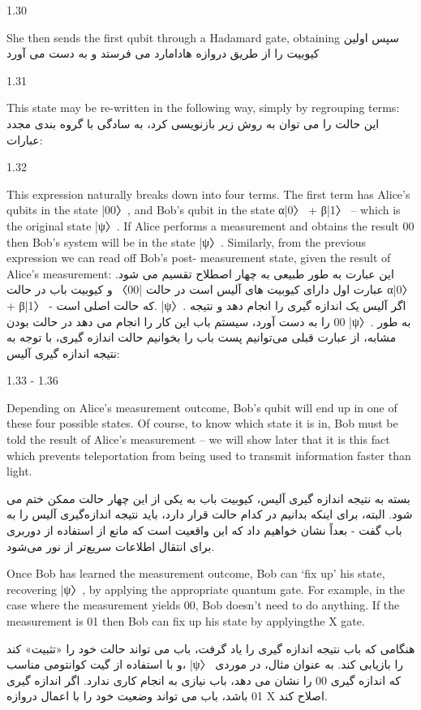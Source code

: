 \documentclass{book}
\begin{document}
1.30


She then sends the first qubit through a Hadamard gate, obtaining
سپس اولین کیوبیت را از طریق دروازه هادامارد می فرستد و به دست می آورد

1.31


This state may be re-written in the following way, simply by regrouping terms:
این حالت را می توان به روش زیر بازنویسی کرد، به سادگی با گروه بندی مجدد عبارات:

1.32


This expression naturally breaks down into four terms. The first term has Alice’s qubits
in the state |00〉, and Bob’s qubit in the state α|0〉 + β|1〉 – which is the original state
|ψ〉. If Alice performs a measurement and obtains the result 00 then Bob’s system will
be in the state |ψ〉. Similarly, from the previous expression we can read off Bob’s post-
measurement state, given the result of Alice’s measurement:
این عبارت به طور طبیعی به چهار اصطلاح تقسیم می شود. عبارت اول دارای کیوبیت های آلیس است
در حالت |00〉 و کیوبیت باب در حالت α|0〉 + β|1〉 - که حالت اصلی است.
|ψ〉. اگر آلیس یک اندازه گیری را انجام دهد و نتیجه 00 را به دست آورد، سیستم باب این کار را انجام می دهد
در حالت بودن |ψ〉. به طور مشابه، از عبارت قبلی می‌توانیم پست باب را بخوانیم
حالت اندازه گیری، با توجه به نتیجه اندازه گیری آلیس:



1.33 - 1.36


Depending on Alice’s measurement outcome, Bob’s qubit will end up in one of these four possible states. Of course, to know which state it is in, Bob must be told the result of Alice’s measurement – we will show later that it is this fact which prevents teleportation from being used to transmit information faster than light.

بسته به نتیجه اندازه گیری آلیس، کیوبیت باب به یکی از این چهار حالت ممکن ختم می شود. البته، برای اینکه بدانیم در کدام حالت قرار دارد، باید نتیجه اندازه‌گیری آلیس را به باب گفت - بعداً نشان خواهیم داد که این واقعیت است که مانع از استفاده از دوربری برای انتقال اطلاعات سریع‌تر از نور می‌شود.


 Once Bob has learned the measurement outcome, Bob can ‘fix up’ his state, recovering |ψ〉, by applying the appropriate quantum gate. For example, in the case where the measurement yields 00, Bob doesn’t need to do anything. If the measurement is 01 then Bob can fix up his state by applyingthe X gate. 


هنگامی که باب نتیجه اندازه گیری را یاد گرفت، باب می تواند حالت خود را «تثبیت» کند و با استفاده از گیت کوانتومی مناسب، |ψ〉 را بازیابی کند. به عنوان مثال، در موردی که اندازه گیری 00 را نشان می دهد، باب نیازی به انجام کاری ندارد. اگر اندازه گیری 01 باشد، باب می تواند وضعیت خود را با اعمال دروازه X اصلاح کند.
\end{document}
